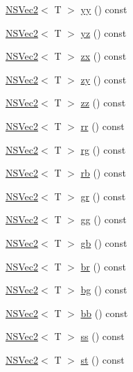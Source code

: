 \begin{DoxyCompactItemize}
\item 
\hyperlink{structNSVec2}{N\-S\-Vec2}$<$ T $>$ \hyperlink{structNSVec3_ab8ba1f068fe7c956c84a90c8dc3aa1ee}{yy} () const 
\item 
\hyperlink{structNSVec2}{N\-S\-Vec2}$<$ T $>$ \hyperlink{structNSVec3_ad9006cfc08381fb525d43715059f7c15}{yz} () const 
\item 
\hyperlink{structNSVec2}{N\-S\-Vec2}$<$ T $>$ \hyperlink{structNSVec3_aa535678eef6a077d24ce6ec4fd234af3}{zx} () const 
\item 
\hyperlink{structNSVec2}{N\-S\-Vec2}$<$ T $>$ \hyperlink{structNSVec3_aa9ff23a9a0536a8be1067d10a1973784}{zy} () const 
\item 
\hyperlink{structNSVec2}{N\-S\-Vec2}$<$ T $>$ \hyperlink{structNSVec3_a444a1ab8b01941d5621a05f4c3feb466}{zz} () const 
\item 
\hyperlink{structNSVec2}{N\-S\-Vec2}$<$ T $>$ \hyperlink{structNSVec3_a61d59755412ebfcc9567f3cd1d0f8d66}{rr} () const 
\item 
\hyperlink{structNSVec2}{N\-S\-Vec2}$<$ T $>$ \hyperlink{structNSVec3_a5815f56f7307f10498a47ffad1661695}{rg} () const 
\item 
\hyperlink{structNSVec2}{N\-S\-Vec2}$<$ T $>$ \hyperlink{structNSVec3_a4a35d75bd878b237405b84736e7ebcd4}{rb} () const 
\item 
\hyperlink{structNSVec2}{N\-S\-Vec2}$<$ T $>$ \hyperlink{structNSVec3_a6a9da9c3158c49b0cd867d1bed79918f}{gr} () const 
\item 
\hyperlink{structNSVec2}{N\-S\-Vec2}$<$ T $>$ \hyperlink{structNSVec3_aacda1e9e49f26255e4db0eb4ee65012c}{gg} () const 
\item 
\hyperlink{structNSVec2}{N\-S\-Vec2}$<$ T $>$ \hyperlink{structNSVec3_af0c314a46ce429beca617d7beddba4c6}{gb} () const 
\item 
\hyperlink{structNSVec2}{N\-S\-Vec2}$<$ T $>$ \hyperlink{structNSVec3_a93c5209ffe941fbc5250f8fae6f198fe}{br} () const 
\item 
\hyperlink{structNSVec2}{N\-S\-Vec2}$<$ T $>$ \hyperlink{structNSVec3_a3fb23ce80064bae66231a9ac99b6f65f}{bg} () const 
\item 
\hyperlink{structNSVec2}{N\-S\-Vec2}$<$ T $>$ \hyperlink{structNSVec3_ab90837dc443f2128d2f9b9db23ad07e2}{bb} () const 
\item 
\hyperlink{structNSVec2}{N\-S\-Vec2}$<$ T $>$ \hyperlink{structNSVec3_a07c973c8f7c4525bc3b7ea31e53541f6}{ss} () const 
\item 
\hyperlink{structNSVec2}{N\-S\-Vec2}$<$ T $>$ \hyperlink{structNSVec3_a81e5dcefea4744a1ead5d46d2c7634de}{st} () const 

\end{DoxyCompactItemize}
